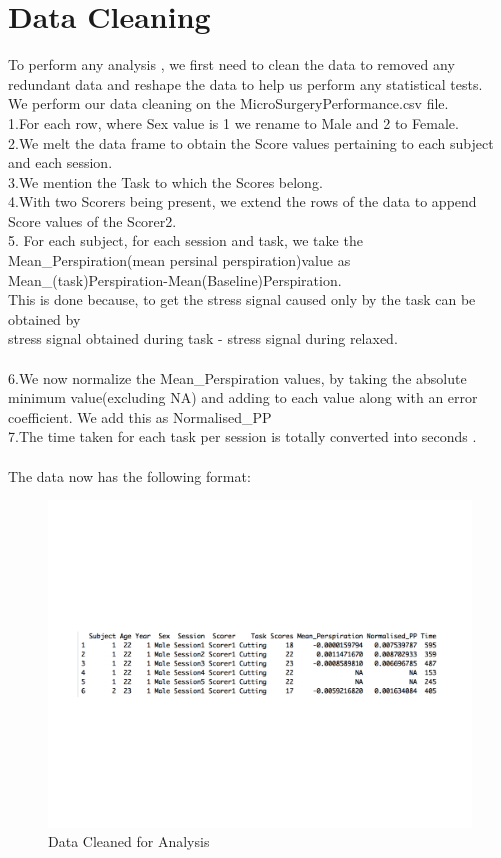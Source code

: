 \documentclass[12pt,epsf]{report}
\begin{document}
\section*{Data Cleaning}
{To perform any analysis , we first need to clean the data to removed any redundant data and reshape the data to help us perform any statistical tests.\\
We perform our data cleaning on the MicroSurgeryPerformance.csv file.\\
1.For each row, where Sex value is 1 we rename to Male and 2 to Female.\\
2.We melt the data frame to obtain the Score values pertaining to each subject and each session.\\
3.We mention the Task to which the Scores belong.\\
4.With two Scorers being present, we extend the rows of the data to append Score values of the Scorer2.\\
5. For each subject, for each session and task, we take the Mean\_Perspiration(mean persinal perspiration)value as Mean\_(task)Perspiration-Mean(Baseline)Perspiration. \\
This is done because, to get the stress signal caused only by the task can be obtained by \\
stress signal obtained during task - stress signal during relaxed.\\
\\
6.We now normalize the Mean\_Perspiration values, by taking the absolute minimum value(excluding NA) and adding to each value along with an error coefficient. We add this as Normalised\_PP\\
7.The time taken for each task per session is totally converted into seconds .\\
\\
The data  now has the following format:\\
\begin{figure}[!htb]
	
	\includegraphics[width=1.1\textwidth]{New_data.pdf}
	\caption{Data Cleaned for Analysis}
\end{figure}}
\newpage
\end{document}
